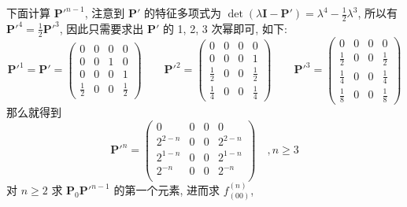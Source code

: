 \documentclass[boxes]{homework}
\begin{document}
\begin{solution}
    下面计算 ${\boldsymbol{P}'}^{n - 1}$, 注意到 $\boldsymbol{P}'$ 的特征多项式为 $\det(\lambda
        \boldsymbol{I} - \boldsymbol{P}') = \lambda^4 - \frac{1}{2}\lambda^3$, 所以有
    ${\boldsymbol{P}'}^4 = \frac{1}{2}{\boldsymbol{P}'}^3$, 因此只需要求出 $\boldsymbol{P}'$ 的 1, 2,
    3 次幂即可, 如下:
    \begin{equation}
        {\boldsymbol{P}'}^1 = \boldsymbol{P}' = \begin{pmatrix}
            0           & 0 & 0 & 0           \\
            0           & 0 & 1 & 0           \\
            0           & 0 & 0 & 1           \\
            \frac{1}{2} & 0 & 0 & \frac{1}{2}
        \end{pmatrix}
        \qquad
        {\boldsymbol{P}'}^2 = \begin{pmatrix}
            0           & 0 & 0 & 0           \\
            0           & 0 & 0 & 1           \\
            \frac{1}{2} & 0 & 0 & \frac{1}{2} \\
            \frac{1}{4} & 0 & 0 & \frac{1}{4}
        \end{pmatrix}
        \qquad
        {\boldsymbol{P}'}^3 = \begin{pmatrix}
            0           & 0 & 0 & 0           \\
            \frac{1}{2} & 0 & 0 & \frac{1}{2} \\
            \frac{1}{4} & 0 & 0 & \frac{1}{4} \\
            \frac{1}{8} & 0 & 0 & \frac{1}{8}
        \end{pmatrix}
    \end{equation}
    那么就得到
    \begin{equation}
        {\boldsymbol{P}'}^n = \begin{pmatrix}
            0         & 0 & 0 & 0         \\
            2^{2 - n} & 0 & 0 & 2^{2 - n} \\
            2^{1 - n} & 0 & 0 & 2^{1 - n} \\
            2^{- n}   & 0 & 0 & 2^{- n}   \\
        \end{pmatrix}
        \quad , n \ge 3
    \end{equation}
    对 $n \ge 2$ 求 $\boldsymbol{P}_0{\boldsymbol{P}'}^{n - 1}$ 的第一个元素, 进而求 $f_{(00)}^{(n)}$,

\end{solution}
\end{document}
